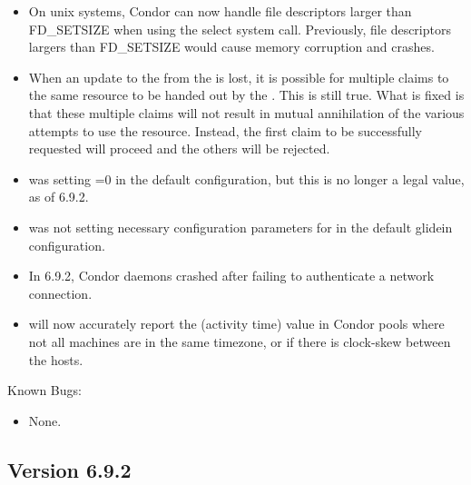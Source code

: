 \begin{itemize}

\item On unix systems, Condor can now handle file descriptors larger than
FD\_SETSIZE when using the select system call. Previously, file descriptors
largers than FD\_SETSIZE would cause memory corruption and crashes.

\item When an update to the  from the
 is lost, it is possible for multiple claims to the
same resource to be handed out by the .  This is
still true.  What is fixed is that these multiple claims will not
result in mutual annihilation of the various attempts to use the
resource.  Instead, the first claim to be successfully requested will
proceed and the others will be rejected.

\item {} was setting =0 in the default
configuration, but this is no longer a legal value, as of 6.9.2.

\item {} was not setting necessary configuration parameters
for  in the default glidein configuration.

\item In 6.9.2, Condor daemons crashed after failing to authenticate a
network connection.

\item {} will now accurately report the 
  (activity time) value in Condor pools where not all machines are in
  the same timezone, or if there is clock-skew between the hosts.

\end{itemize}

\noindent Known Bugs:

\begin{itemize}

\item None.

\end{itemize}

\subsection*{\label{sec:New-6-9-2}Version 6.9.2}

